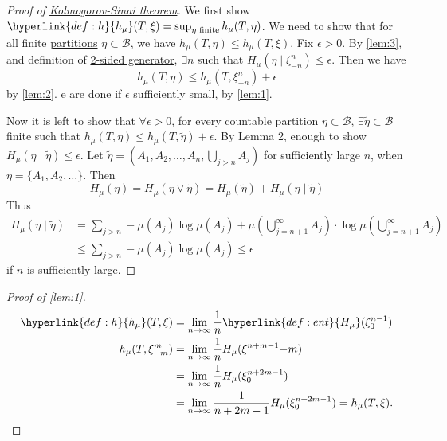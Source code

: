 \documentclass{article}
\begin{document}
\begin{proof}[Proof of \hyperlink{thm:ks}{Kolmogorov-Sinai theorem}]
  We first show $\hyperlink{def:h}{h_\mu}(T, \xi) = \sup_{\eta\text{ finite}} h_\mu(T,\eta)$.
  We need to show that for all finite \hyperlink{def:partition}{partitions} $\eta \subset \mathcal{B}$, we have $h_\mu(T, \eta) \leq h_\mu(T, \xi)$.
  Fix $\epsilon > 0$. By \cref{lem:3}, and definition of \hyperlink{def:gen}{2-sided generator}, $\exists n$ such that $H_\mu(\eta \mid \xi^n_{-n}) \leq \epsilon$.
  Then we have
  \begin{equation*}
    h_\mu(T, \eta) \leq h_\mu(T, \xi^{n}_{-n}) + \epsilon %
  \end{equation*}
  by \cref{lem:2}.
  e are done if $\epsilon$ sufficiently small, by \cref{lem:1}.

  Now it is left to show that $\forall \epsilon > 0$, for every countable partition $\eta \subset \mathcal{B}$, $\exists \tilde{\eta} \subset \mathcal{B}$ finite such that $h_\mu(T,\eta) \leq h_\mu(T, \tilde{\eta}) + \epsilon$.
  By Lemma 2, enough to show $H_\mu(\eta \mid \tilde{\eta}) \leq \epsilon$.
  Let $\tilde{\eta} = (A_1, A_2, \dotsc, A_n, \bigcup_{j > n} A_j)$ for sufficiently large $n$, when $\eta = \{A_1, A_2, \dotsc\}$.
  Then
  \begin{equation*}
    H_\mu(\eta) = H_\mu(\eta \vee \tilde{\eta}) = H_\mu(\tilde{\eta}) + H_\mu(\eta \mid \tilde{\eta})
  \end{equation*}
  Thus
  \begin{align*}
    H_\mu(\eta \mid \tilde{\eta}) &= \sum_{j > n} -\mu(A_j) \log \mu(A_j) + \mu\left(\bigcup_{j={n+1}}^\infty A_j\right) \cdot  \log \mu\left(\bigcup_{j=n+1}^\infty A_j\right) \\
                                  &\leq \sum_{j > n} - \mu(A_j) \log \mu(A_j) \leq \epsilon
  \end{align*}
  if $n$ is sufficiently large.
\end{proof}
\begin{proof}[Proof of \cref{lem:1}]
  \begin{align*}
    \hyperlink{def:h}{h_\mu}(T, \xi) &= \lim_{n \to \infty} \frac{1}{n} \hyperlink{def:ent}{H_\mu}(\xi_0^{n-1}) \\
    h_\mu(T, \xi^m_{-m}) &= \lim_{n \to \infty} \frac{1}{n} H_\mu(\xi^{n+m-1}{-m}) \\
                         &= \lim_{n \to \infty} \frac{1}{n} H_\mu(\xi^{n+2m-1}_0) \\
                         &= \lim_{n \to \infty} \frac{1}{n+2m-1} H_\mu(\xi^{n+2m-1}_0) = h_\mu(T, \xi). \qedhere
  \end{align*}
\end{proof}
\end{document}
